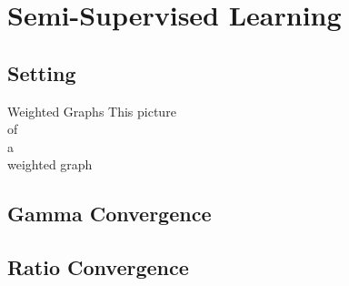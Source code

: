 \chapter{Semi-Supervised Learning}\label{ch:SSL}
%
\section{Setting}
\begin{definition}{Weighted Graphs}{}
This picture\\
of\\
a\\
weighted graph
\end{definition}
%
\section{Gamma Convergence}
%
\section{Ratio Convergence}
%

